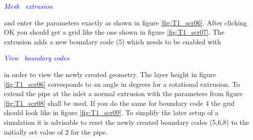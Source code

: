 \documentclass[10pt,a4paper,british]{book}
\newcommand\arr{\guillemotright\ }
\newcommand\menu[1]{\textcolor{blue}{\it \hspace{5mm} #1}}
\begin{document}
\menu{Mesh \arr extrusion}

and enter the parameters exactly as shown in figure \ref{fig:T1_scr06}. After clicking OK you should get a grid like the one shown in figure \ref{fig:T1_scr07}. The extrusion adds a new boundary code (5) which needs to be enabled with

\menu{View \arr boundary codes}

in order to view the newly created geometry. The layer height in figure \ref{fig:T1_scr06} corresponds to an angle in degrees for a rotational extrusion. To extend the pipe at the inlet a normal extrusion with the parameters from figure \ref{fig:T1_scr08} shall be used. If you do the same for boundary code 4 the grid should look like in figure \ref{fig:T1_scr09}. To simplify the later setup of a simulation it is advisable to reset the newly created boundary codes (5,6,8) to the initially set value of 2 for the pipe.
\end{document}
